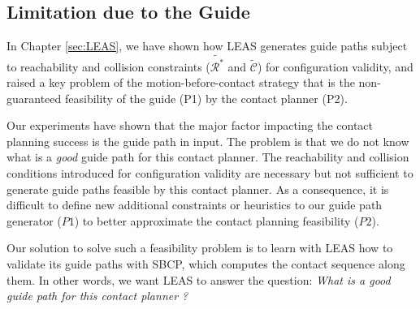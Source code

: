 \subsection{Limitation due to the Guide}

In Chapter \ref{sec:LEAS}, we have shown how LEAS generates guide paths subject to reachability and collision constraints ($\tilde{\mathcal{R}^*}$ and $\tilde{\mathcal{C}}$) for configuration validity, and raised a key problem of the motion-before-contact strategy that is the non-guaranteed feasibility of the guide (P1) by the contact planner (P2).

Our experiments have shown that the major factor impacting the contact planning success is the guide path in input.
The problem is that we do not know what is a \textit{good} guide path for this contact planner. 
The reachability and collision conditions introduced for configuration validity are necessary but not sufficient to generate guide paths feasible by this contact planner. 
As a consequence, it is difficult to define new additional constraints or heuristics to our guide path generator ($P1$) to better approximate the contact planning feasibility ($P2$).

Our solution to solve such a feasibility problem is to learn with LEAS how to validate its guide paths with SBCP, which computes the contact sequence along them. In other words, we want LEAS to answer the question: \textit{What is a good guide path for this contact planner ?}






